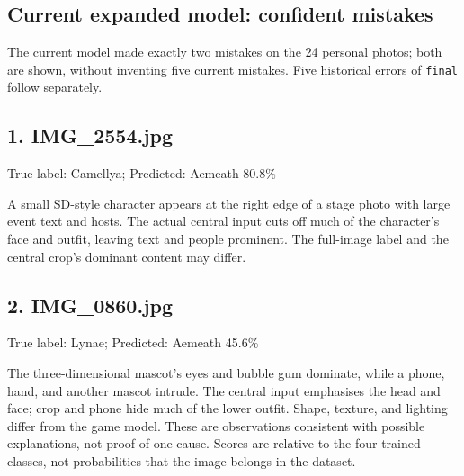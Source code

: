\documentclass[11pt]{article}
\begin{document}
\subsection*{Current expanded model: confident mistakes}
The current model made exactly two mistakes on the 24 personal photos; both are shown, without inventing five current mistakes. Five historical errors of \texttt{final} follow separately.
\par\noindent {}\par
\par\noindent\begin{minipage}{\linewidth}
\subsection*{1. IMG\_2554.jpg}
True label: Camellya; Predicted: Aemeath 80.8\%
\begin{center}\par\noindent {}\par
\end{center}
A small SD-style character appears at the right edge of a stage photo with large event text and hosts. The actual central input cuts off much of the character's face and outfit, leaving text and people prominent. The full-image label and the central crop's dominant content may differ.
\end{minipage}\par\medskip
\par\noindent\begin{minipage}{\linewidth}
\subsection*{2. IMG\_0860.jpg}
True label: Lynae; Predicted: Aemeath 45.6\%
\begin{center}\par\noindent {}\par
\end{center}
The three-dimensional mascot's eyes and bubble gum dominate, while a phone, hand, and another mascot intrude. The central input emphasises the head and face; crop and phone hide much of the lower outfit. Shape, texture, and lighting differ from the game model. These are observations consistent with possible explanations, not proof of one cause. Scores are relative to the four trained classes, not probabilities that the image belongs in the dataset.
\end{minipage}\par\medskip
\end{document}
